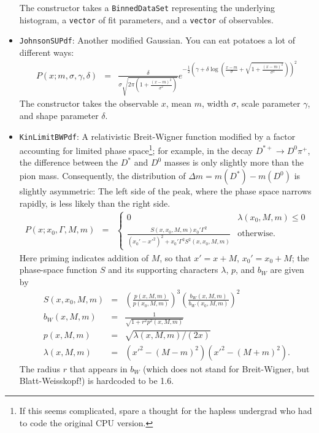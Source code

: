 \documentclass[12pt,pdflatex]{article}
\begin{document}
\begin{itemize}
The constructor takes a \texttt{BinnedDataSet} representing the underlying histogram, 
a \texttt{vector} of fit parameters, and a \texttt{vector} of observables. 
\item \texttt{JohnsonSUPdf}: Another modified Gaussian. You can eat potatoes
a lot of different ways:
\begin{eqnarray}
P(x;m,\sigma,\gamma,\delta) &=&
\frac{\delta}{\sigma\sqrt{2\pi(1+\frac{(x-m)^2}{\sigma^2})}}
e^{-\frac{1}{2}\left(\gamma + \delta\log(\frac{x-m}{\sigma}+\sqrt{1+\frac{(x-m)^2}{\sigma^2}})\right)^2}
\end{eqnarray}
The constructor takes the observable $x$, mean $m$, width $\sigma$, 
scale parameter $\gamma$, and shape parameter $\delta$. 
\item \texttt{KinLimitBWPdf}: A relativistic Breit-Wigner function modified 
by a factor accounting for limited phase space\footnote{If this seems complicated, spare a thought for the hapless undergrad who
had to code the original CPU version.}; for example, in the decay $D^{*+}\to D^0\pi^+$,
the difference between the $D^*$ and $D^0$ masses is only slightly more than the pion mass.
Consequently, the distribution of $\Delta m = m(D^*) - m(D^0)$ is slightly asymmetric: The left
side of the peak, where the phase space narrows rapidly, is less likely than the right side.
\begin{eqnarray}
P(x;x_0,\Gamma,M,m) &=& \left\{ \begin{matrix}
0 & \lambda(x_0,M,m) \le 0 \\
\frac{S(x,x_0,M,m)x_0'\Gamma^2}{\left(x_0'-x'^2\right)^2 + x_0'\Gamma^2S^2(x,x_0,M,m)} & \mathrm{otherwise.}
\end{matrix}
\right. 
\end{eqnarray}
Here priming indicates addition of $M$, so that
$x'=x+M$, $x_0'=x_0+M$; the phase-space function $S$ and its supporting characters $\lambda$, $p$, and $b_W$ are given by
\begin{eqnarray}
S(x,x_0,M,m)   &=& \left(\frac{p(x,M,m)}{p(x_0,M,m)}\right)^3\left(\frac{b_W(x,M,m)}{b_W(x_0,M,m)}\right)^2 \\
b_W(x,M,m)     &=& \frac{1}{\sqrt{1 + r^2p^2(x,M,m)}}\\
p(x,M,m)       &=& \sqrt{\lambda(x,M,m)/(2x)}\\
\lambda(x,M,m) &=& \left(x'^2-(M-m)^2\right)\left(x'^2-(M+m)^2\right).
\end{eqnarray}
The radius $r$ that appears in $b_W$ (which does not stand for Breit-Wigner,
but Blatt-Weisskopf!) is hardcoded to be 1.6. 


\end{itemize}
\end{document}
